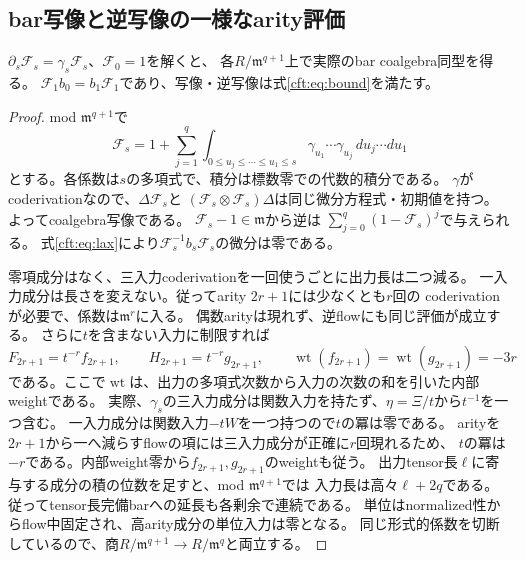 \subsection{bar写像と逆写像の一様なarity評価}
\begin{lemma}[順序付きflowと逆写像]\label{cft:lem:flow}
$\partial_s\mathcal F_s=\gamma_s\mathcal F_s$、$\mathcal F_0=1$を解くと、
各$R/\mathfrak m^{q+1}$上で実際のbar coalgebra同型を得る。
$\mathcal F_1b_0=b_1\mathcal F_1$であり、写像・逆写像は式\eqref{cft:eq:bound}を満たす。
\end{lemma}
\begin{proof}
mod $\mathfrak m^{q+1}$で
\begin{equation}\label{cft:eq:ordered}
 \mathcal F_s=1+\sum_{j=1}^{q}
 \int_{0\le u_j\le\cdots\le u_1\le s}
 \gamma_{u_1}\cdots\gamma_{u_j}\,du_j\cdots du_1
\end{equation}
とする。各係数は$s$の多項式で、積分は標数零での代数的積分である。
$\gamma$がcoderivationなので、$\Delta\mathcal F_s$と
$(\mathcal F_s\otimes\mathcal F_s)\Delta$は同じ微分方程式・初期値を持つ。
よってcoalgebra写像である。
$\mathcal F_s-1\in\mathfrak m$から逆は
$\sum_{j=0}^{q}(1-\mathcal F_s)^j$で与えられる。
式\eqref{cft:eq:lax}により$\mathcal F_s^{-1}b_s\mathcal F_s$の微分は零である。

零項成分はなく、三入力coderivationを一回使うごとに出力長は二つ減る。
一入力成分は長さを変えない。従ってarity $2r+1$には少なくとも$r$回の
coderivationが必要で、係数は$\mathfrak m^r$に入る。
偶数arityは現れず、逆flowにも同じ評価が成立する。
さらに$t$を含まない入力に制限すれば
\begin{equation}\label{cft:eq:t-weight}
 F_{2r+1}=t^{-r}f_{2r+1},\qquad
 H_{2r+1}=t^{-r}g_{2r+1},
 \qquad \operatorname{wt}(f_{2r+1})=
 \operatorname{wt}(g_{2r+1})=-3r
\end{equation}
である。ここで$\operatorname{wt}$は、出力の多項式次数から入力の次数の和を引いた内部weightである。
実際、$\gamma_s$の三入力成分は関数入力を持たず、$\eta=\Xi/t$から$t^{-1}$を一つ含む。
一入力成分は関数入力$-tW$を一つ持つので$t$の冪は零である。
arityを$2r+1$から一へ減らすflowの項には三入力成分が正確に$r$回現れるため、
$t$の冪は$-r$である。内部weight零から$f_{2r+1},g_{2r+1}$のweightも従う。
出力tensor長$\ell$に寄与する成分の積の位数を足すと、mod $\mathfrak m^{q+1}$では
入力長は高々$\ell+2q$である。従ってtensor長完備barへの延長も各剰余で連続である。
単位はnormalized性からflow中固定され、高arity成分の単位入力は零となる。
同じ形式的係数を切断しているので、商$R/\mathfrak m^{q+1}\to R/\mathfrak m^q$と両立する。
\end{proof}

